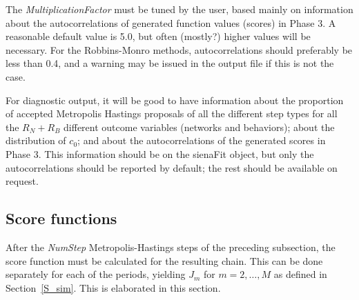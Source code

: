 \documentclass[a4paper,12pt,fleqn]{article}
\begin{document}
The \textit{MultiplicationFactor} must be tuned by the user, based mainly on
information about the autocorrelations of generated function values (scores) in
Phase 3. A reasonable default value is 5.0, but often (mostly?) higher values
will be necessary. For the Robbins-Monro methods, autocorrelations should
preferably be less than 0.4, and a warning may be issued in the output file if
this is not the case.

For diagnostic output, it will be good to have information about
the proportion of accepted Metropolis Hastings proposals
of all the different step types for all the $R_N + R_B$ different
outcome variables (networks and behaviors); about the distribution
of $c_0$; and about the autocorrelations of the generated scores
in Phase 3. This information should be on the sienaFit object,
but only the autocorrelations should be reported by default;
the rest should be available on request.

\subsection{Score functions}

After the \textit{NumStep} Metropolis-Hastings steps of the preceding
subsection, the score function must be calculated for the resulting chain.
This can be done separately for each of the periods, yielding $J_m$
for $m = 2, \ldots, M$ as defined in Section~\ref{S_sim}.
This is elaborated in this section.

\end{document}
